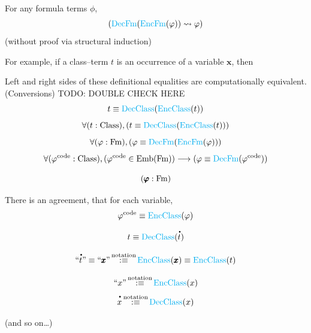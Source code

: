 \begin{metanotation}
\begin{theorem}[]
For any formula terms $\phi$,
\[
({\text{\textcolor{cyan}{DecFm}}}({\text{\textcolor{cyan}{EncFm}}}(\varphi)) \rightsquigarrow \varphi)
\]
(without proof via structural induction)
\end{theorem}

For example, if a class--term $t$ is an occurrence of a variable $\pmb{x}$, then

Left and right sides of these definitional equalities are computationally equivalent.(Conversions)
TODO: DOUBLE CHECK HERE
\[
t\equiv {\text{\textcolor{cyan}{DecClass}}}({\text{\textcolor{cyan}{EncClass}}}(t))
\]
\[
\forall (t:{\text{Class}}),
(t\equiv {\text{\textcolor{cyan}{DecClass}}}({\text{\textcolor{cyan}{EncClass}}}(t)))
\]
\[
\forall (\varphi:\mathrm{Fm}),
(\varphi\equiv {\text{\textcolor{cyan}{DecFm}}}({\text{\textcolor{cyan}{EncFm}}}(\varphi)))
\]
\[
\forall (\varphi^{\text{code}}:{\text{Class}}),
(\varphi^{\text{code}} \in \text{Emb(Fm)})
\longrightarrow
(\varphi\equiv {\text{\textcolor{cyan}{DecFm}}}(\varphi^{\text{code}}))
\]




\[
(\pmb{\varphi}:\mathrm{Fm})
\]

There is an agreement, that for each variable,
\[
\varphi^{\text{code}}
\equiv
{\text{\textcolor{cyan}{EncClass}}}(\varphi)
\]


\[
t\equiv \DecClass(\meta{t})
\]



\[
``\meta{t}"
\equiv
``\pmb{x}"
\equivnot
\EncClass(\pmb{x})
\equiv
\EncClass(t)
\]

\[
``x"\,{\stackrel{{\textrm{notation}}}{:\equiv}}\, {\text{\textcolor{cyan}{EncClass}}}(x) 
\]
\[
\meta{x}\equivnot \DecClass(x) 
\]


(and so on\dots)
\end{metanotation}


